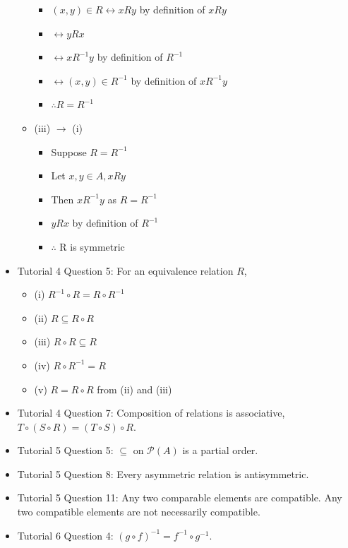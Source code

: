 \documentclass[10pt, portrait]{article}
\begin{document}
\begin{multicols*}{2}
\begin{itemize}
\begin{itemize}
\begin{itemize}
            \item $(x, y) \in R \leftrightarrow x R y$ by definition of $x R y$
            \item $\leftrightarrow y R x$
            \item $\leftrightarrow x R^{-1} y$ by definition of $R^{-1}$
            \item $\leftrightarrow (x, y) \in R^{-1}$ by definition of $x R^{-1} y$
            \item $\therefore R = R^{-1}$
        \end{itemize}
        \item (iii) $\rightarrow$ (i)
        \begin{itemize}
            \item Suppose $R = R^{-1}$
            \item Let $x, y \in A, x R y$
            \item Then $x R^{-1} y$ as $R = R^{-1}$
            \item $y R x$ by definition of $R^{-1}$
            \item $\therefore$ R is symmetric
        \end{itemize}
    \end{itemize}
    \item Tutorial 4 Question 5: For an equivalence relation $R$,
    \begin{itemize}
        \item (i) $R^{-1} \circ R = R \circ R^{-1}$
        \item (ii) $R \subseteq R \circ R$
        \item (iii) $R \circ R \subseteq R$
        \item (iv) $R \circ R^{-1} = R$
        \item (v) $R = R \circ R$ from (ii) and (iii)
    \end{itemize}
    \item Tutorial 4 Question 7: Composition of relations is associative, $T \circ (S \circ R) = (T \circ S) \circ R$.
    \item Tutorial 5 Question 5: $\subseteq$ on $\mathcal{P}(A)$ is a partial order.
    \item Tutorial 5 Question 8: Every asymmetric relation is antisymmetric.
    \item Tutorial 5 Question 11: Any two comparable elements are compatible. Any two compatible elements are not necessarily compatible.
    \item Tutorial 6 Question 4: $(g \circ f)^{-1} = f^{-1} \circ g^{-1}$.

\end{itemize}
\end{multicols*}
\end{document}
